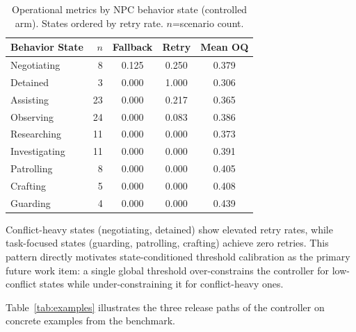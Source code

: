 \documentclass[conference]{IEEEtran}
\begin{document}
\begin{table}[!t]
\renewcommand{\arraystretch}{1.15}
\caption{Operational metrics by NPC behavior state (controlled
arm). States ordered by retry rate. $n$=scenario count.}
\label{tab:states}
\centering
\setlength{\tabcolsep}{3pt}
\begin{tabular}{lrccc}
\toprule
Behavior State & $n$ & Fallback & Retry & Mean OQ \\
\midrule
Negotiating   & 8  & 0.125 & 0.250 & 0.379 \\
Detained      & 3  & 0.000 & 1.000 & 0.306 \\
Assisting     & 23 & 0.000 & 0.217 & 0.365 \\
Observing     & 24 & 0.000 & 0.083 & 0.386 \\
Researching   & 11 & 0.000 & 0.000 & 0.373 \\
Investigating & 11 & 0.000 & 0.000 & 0.391 \\
Patrolling    & 8  & 0.000 & 0.000 & 0.405 \\
Crafting      & 5  & 0.000 & 0.000 & 0.408 \\
Guarding      & 4  & 0.000 & 0.000 & 0.439 \\
\bottomrule
\end{tabular}
\end{table}

Conflict-heavy states (negotiating, detained) show elevated
retry rates, while task-focused states (guarding, patrolling,
crafting) achieve zero retries. This pattern directly motivates
state-conditioned threshold calibration as the primary future
work item: a single global threshold over-constrains the
controller for low-conflict states while under-constraining it
for conflict-heavy ones.

Table~\ref{tab:examples} illustrates the three release paths
of the controller on concrete examples from the benchmark.
\end{document}
